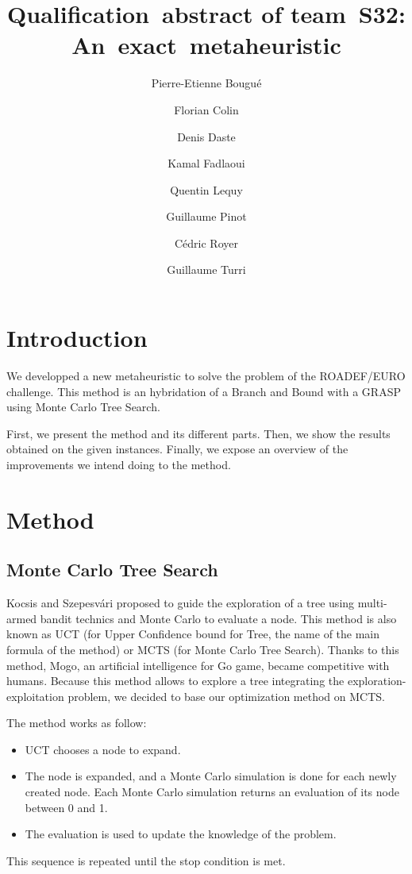 \documentclass[a4paper,twocolumn]{article}
\title{Qualification~abstract of team~S32:
  An~exact~metaheuristic}
\author{Pierre-Etienne Bougué \and Florian Colin \and Denis Daste
  \and Kamal Fadlaoui \and Quentin Lequy \and Guillaume Pinot \and
  Cédric Royer \and Guillaume Turri}
\begin{document}
\maketitle

\section{Introduction}

We developped a new metaheuristic to solve the problem of the
ROADEF/EURO challenge.  This method is an hybridation
of a Branch and Bound with a GRASP using Monte Carlo Tree Search.

First, we present the method and its different parts.  Then, we show
the results obtained on the given instances.  Finally, we expose an overview of
the improvements we intend doing to the method.

\section{Method}

\subsection{Monte Carlo Tree Search}

Kocsis and Szepesv\'ari\cite{kocsis2006bandit} proposed to guide the exploration 
of a tree using multi-armed bandit technics and Monte Carlo to evaluate
a node.  This method is also known as UCT (for Upper Confidence bound
for Tree, the name of the main formula of the method) or MCTS (for
Monte Carlo Tree Search).  Thanks to this method, Mogo, an
artificial intelligence for Go game, became competitive with 
humans\cite{gelly2007contribution}.  Because this method allows to 
explore a tree integrating the exploration-exploitation problem,
we decided to base our optimization method on MCTS.

The method works as follow:
\begin{itemize}
\item UCT chooses a node to expand.
\item The node is expanded, and a Monte Carlo simulation is done for
  each newly created node. Each Monte Carlo simulation returns an
  evaluation of its node between 0 and 1.
\item The evaluation is used to update the
  knowledge of the problem.
\end{itemize}
This sequence is repeated until the stop condition is met.
\end{document}
